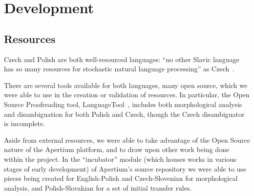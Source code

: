 \documentclass[11pt]{article}
\begin{document}
\section{Development}

\subsection{Resources}

Czech and Polish are both well-resourced languages: 
``no other Slavic language has so many resources for
stochastic natural language processing'' as Czech~\citep{Hajic03}. 

There are several tools available for both languages, many open source, 
which we were able to use in the creation or validation of resources.
In particular, the Open Source Proofreading tool, LanguageTool~\citep{Milkowski10},
includes both morphological analysis and disambiguation for both Polish and
Czech, though the Czech disambiguator is incomplete.

Aside from external resources, we were able to take advantage of the Open Source nature
of the Apertium platform, and to draw upon other work being done within the project. In 
the ``incubator'' module (which houses works in various stages of early development) of 
Apertium's source repository we were able to use pieces being created for English-Polish 
and Czech-Slovenian for morphological analysis, and Polish-Slovakian for a set of initial 
transfer rules.
\end{document}
